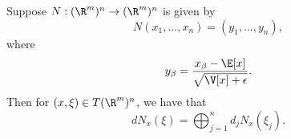\begin{comment}
To simplify the expression for implementation in python, we make the auxiliary definitions (which only depend on the forward propagating computations)
$$y:=N(x),$$
and
$$\theta:=(\sigma^2+\vec{\epsilon})^{\odot-\frac{1}{2}}.$$
Then our computation reduces to
\begin{align*}
	dN_x(\xi)&=-\frac{1}{n}(x-\mu\vec{1}^T)\odot
\end{align*}















\begin{align*}
	dN_x(\xi)&=-\frac{1}{n}\eta\circ R_{\vec{1}^T}\circ\Theta\circ R_{\vec{1}}\circ\eta(\xi)+\theta\circ\left(\id-\frac{1}{n}R_{\vec{1}^T}\circ R_{\vec{1}}\right)(\xi)\\
	&=\left[-\frac{1}{n}\eta\circ R_{\vec{1}^T}\circ\Theta\circ R_{\vec{1}}\circ\eta+\theta-\frac{1}{n}\theta\circ R_{\vec{1}^T}\circ R_{\vec{1}}\right](\xi).
\end{align*}
Then for $\zeta\in T_{N(x)}\R^{m\times n}$, we have the reverse differential
\begin{align*}
	\ip{rN_x(\zeta),\xi}_F&=\ip{\zeta,dN_x(\xi)}_F\\
	&=\ip{\left[-\frac{1}{n}\eta\circ R_{\vec{1}^T}\circ \Theta\circ R_{\vec{1}}\circ\eta+\theta-\frac{1}{n}R_{\vec{1}^T}\circ R_{\vec{1}}\circ\theta\right](\zeta),\xi}_F.
\end{align*}

\subsection{The Normalization Operator v.2}


\end{comment}






Suppose $N:(\R^m)^n\to(\R^m)^n$ is given by
$$N(x_1,...,x_n)=(y_1,...,y_n),$$
where
$$y_\beta=\frac{x_\beta-\E[x]}{\sqrt{\V[x]+\epsilon}}.$$
Then for $(x,\xi)\in T(\R^m)^n$, we have that
$$dN_x(\xi)=\bigoplus_{j=1}^nd_jN_x(\xi_j).$$

